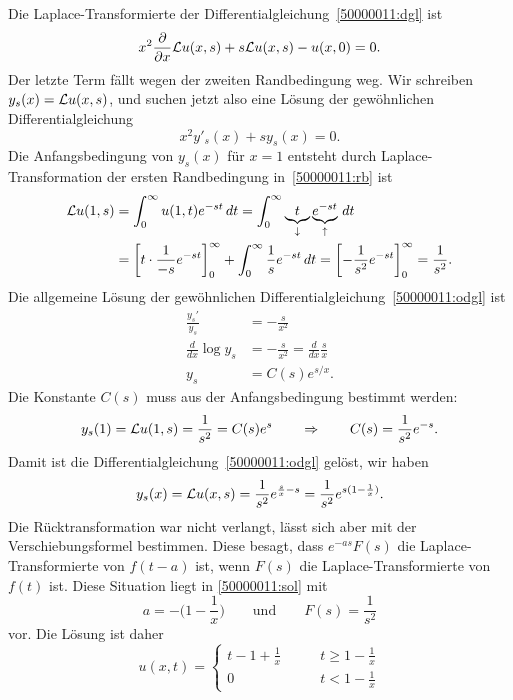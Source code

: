 \begin{loesung}
Die Laplace-Transformierte der Differentialgleichung~\eqref{50000011:dgl} ist
\begin{equation}
x^2\frac{\partial}{\partial x}{\cal L}u(x,s) + s{\cal L}u(x,s) - u(x,0)=0.
\end{equation}
Der letzte Term fällt wegen der zweiten Randbedingung weg.
Wir schreiben $y_s(x)={\cal L}u(x,s)$, und suchen jetzt also eine Lösung
der gewöhnlichen Differentialgleichung
\begin{equation}
x^2y'_s(x) + sy_s(x)=0.
\label{50000011:odgl}
\end{equation}
Die Anfangsbedingung von $y_s(x)$ für $x=1$ entsteht durch
Laplace-Transformation der ersten Randbedingung in~\eqref{50000011:rb} ist
\begin{align*}
{\cal L}u(1,s)
&=
\int_0^\infty u(1,t)e^{-st}\,dt
=
\int_0^\infty \underbrace{t}_{\downarrow}\underbrace{e^{-st}}_{\uparrow}\,dt
\\
&=
\biggl[
t\cdot \frac1{-s}e^{-st}
\biggr]_0^\infty
+\int_0^\infty \frac1se^{-st}\,dt
=
\biggl[
-\frac1{s^2}e^{-st}
\biggr]_0^\infty=\frac1{s^2}.
\end{align*}
Die allgemeine Lösung der gewöhnlichen Differentialgleichung~\eqref{50000011:odgl} ist
\begin{align*}
\frac{y_s'}{y_s}&=-\frac{s}{x^2}
\\
\frac{d}{dx} \log y_s &= -\frac{s}{x^2}=\frac{d}{dx}\frac{s}{x}
\\
y_s&=C(s)e^{s/x}.
\end{align*}
Die Konstante $C(s)$ muss aus der Anfangsbedingung bestimmt werden:
\[
y_s(1)={\cal L}u(1,s)=\frac1{s^2}=C(s)e^{s}
\qquad\Rightarrow\qquad
C(s)=\frac1{s^2}e^{-s}.
\]
Damit ist die Differentialgleichung~\eqref{50000011:odgl} gelöst, wir haben
\begin{equation}
y_s(x)
=
{\cal L}u(x,s)
=
\frac1{s^2}e^{\frac{s}{x}-s}
=
\frac1{s^2}e^{s(1-\frac1x)}.
\label{50000011:sol}
\end{equation}
Die Rücktransformation war nicht verlangt, lässt sich aber mit der
Verschiebungsformel bestimmen.
Diese besagt, dass $e^{-as}F(s)$ die Laplace-Transformierte von 
$f(t-a)$ ist, wenn $F(s)$ die Laplace-Transformierte von $f(t)$ ist.
Diese Situation liegt in \eqref{50000011:sol} mit
\[
a = -\biggl(1-\frac1x\biggr)
\qquad\text{und}\qquad
F(s)=\frac1{s^2}
\]
vor.
Die Lösung ist daher
\[
u(x,t)
=
\begin{cases}
t-1+\frac1x
&\qquad t \ge 1-\frac1x
\\
0
&\qquad t < 1-\frac1x

\end{cases}\]
\end{loesung}

